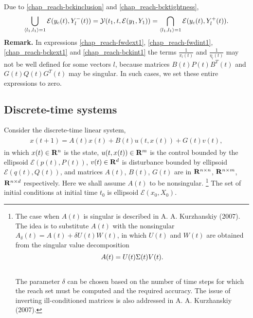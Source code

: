 \documentclass[letterpaper,10pt,english]{sphinxmanual}
\begin{document}
Due to \eqref{chap_reach-bckinclusion} and \eqref{chap_reach-bcktightness},
\begin{gather}
\begin{split}\bigcup_{\langle l_1,l_1\rangle=1}{\mathcal E}(y_c(t),Y^-_l(t)) =
{\mathcal Y}(t_1,t,{\mathcal E}(y_1,Y_1)) =
\bigcap_{\langle l_1,l_1\rangle=1}{\mathcal E}(y_c(t),Y^+_l(t)).\end{split}\notag
\end{gather}
\textbf{Remark.} In expressions \eqref{chap_reach-fwdext1}, \eqref{chap_reach-fwdint1}, \eqref{chap_reach-bckext1} and
\eqref{chap_reach-bckint1} the terms $\frac{1}{\pi_l(t)}$ and
$\frac{1}{\eta_l(t)}$ may not be well defined for some vectors
$l$, because matrices $B(t)P(t)B^T(t)$ and
$G(t)Q(t)G^T(t)$ may be singular. In such cases, we set these
entire expressions to zero.


\subsection{Discrete-time systems}
\label{chap_reach:discrete-time-systems}
Consider the discrete-time linear system,
\label{chap_reach:equation-dtsystem}\begin{gather}
\begin{split}x(t+1) = A(t)x(t) + B(t)u(t,x(t)) + G(t)v(t),\end{split}\label{chap_reach-dtsystem}
\end{gather}
in which $x(t)\in{\bf R}^n$ is the state,
$u(t, x(t))\in{\bf R}^m$ is the control bounded by the ellipsoid
${\mathcal E}(p(t),P(t))$, $v(t)\in{\bf R}^d$ is disturbance
bounded by ellipsoid ${\mathcal E}(q(t),Q(t))$, and matrices
$A(t)$, $B(t)$, $G(t)$ are in
${\bf R}^{n\times n}$, ${\bf R}^{n\times m}$,
${\bf R}^{n\times d}$ respectively. Here we shall assume
$A(t)$ to be nonsingular. \footnote{
The case when $A(t)$ is singular is described in A. A.
Kurzhanskiy (2007). The idea is to substitute $A(t)$ with the
nonsingular $A_\delta(t) = A(t) + \delta U(t)W(t)$, in which
$U(t)$ and $W(t)$ are obtained from the singular value
decomposition
\begin{gather}
\begin{split}A(t) = U(t)\Sigma(t)V(t) .\end{split}\notag\\\begin{split}\end{split}\notag
\end{gather}
The parameter $\delta$ can be chosen based on the number of
time steps for which the reach set must be computed and the required
accuracy. The issue of inverting ill-conditioned matrices is also
addressed in A. A. Kurzhanskiy (2007).
} The set of initial conditions at
initial time $t_0$ is ellipsoid ${\mathcal E}(x_0,X_0)$.
\end{document}
